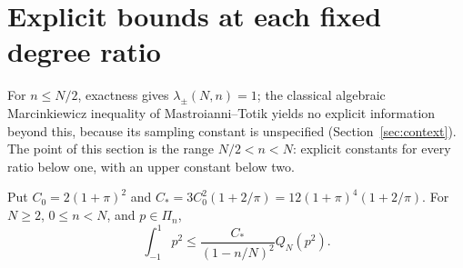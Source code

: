 \documentclass{siamart251216}
\newcommand{\Pn}{\Pi}
\begin{document}
\section{Explicit bounds at each fixed degree ratio}\label{sec:ratio}

For $n\le N/2$, exactness gives $\lambda_\pm(N,n)=1$; the classical
algebraic Marcinkiewicz inequality of Mastroianni--Totik \cite{LIT-051}
yields no explicit information beyond this, because its sampling constant is
unspecified (Section~\ref{sec:context}). The point of this section is the range
$N/2<n<N$: explicit constants for every ratio below one, with an upper
constant below two.

\begin{theorem}\label{thm:ratio-lower}%
Put $C_0=2(1+\pi)^2$ and
$C_*=3C_0^2(1+2/\pi)=12(1+\pi)^4(1+2/\pi)$.
For $N\ge2$, $0\le n<N$, and $p\in\Pn_n$,
\begin{equation}\label{eq:fixedlower}
 \int_{-1}^1p^2\le\frac{C_*}{(1-n/N)^2}Q_N(p^2).
\end{equation}
\end{theorem}
\end{document}
